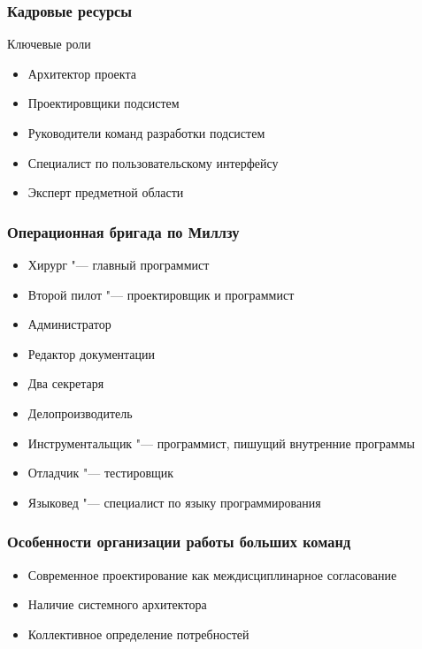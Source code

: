 \documentclass{../industrial-development}
\begin{document}
    \begin{frame} \frametitle{Кадровые ресурсы}    
        \begin{block}{Ключевые роли}
            \begin{itemize}
                \item Архитектор проекта
                \item Проектировщики подсистем
                \item Руководители команд разработки подсистем
                \item Специалист по пользовательскому интерфейсу
                \item Эксперт предметной области
            \end{itemize}
        \end{block}
    \end{frame}

    \begin{frame} \frametitle{Операционная бригада по Миллзу}
        \begin{itemize}
         \item Хирург "--- главный программист
         \item Второй пилот "--- проектировщик и программист
         \item Администратор
         \item Редактор документации
         \item Два секретаря
         \item Делопроизводитель
         \item Инструментальщик "--- программист, пишущий внутренние программы
         \item Отладчик "--- тестировщик
         \item Языковед "--- специалист по языку программирования
        \end{itemize}
    \end{frame}

    \begin{frame} \frametitle{Особенности организации работы больших команд}
        \begin{itemize}
            \item Современное проектирование как междисциплинарное согласование
            \item Наличие системного архитектора
            \item Коллективное определение потребностей
        \end{itemize}
    \end{frame}
\end{document}
